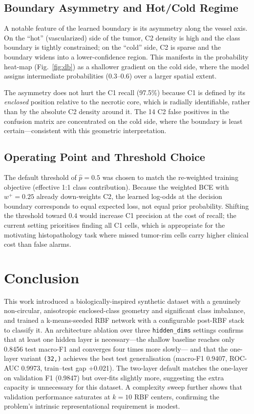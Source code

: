 \documentclass[conference]{IEEEtran}
\begin{document}
\subsection{Boundary Asymmetry and Hot/Cold Regime}
A notable feature of the learned boundary is its asymmetry along the vessel
axis.  On the ``hot'' (vascularized) side of the tumor, C2 density is high
and the class boundary is tightly constrained; on the ``cold'' side, C2 is
sparse and the boundary widens into a lower-confidence region.
This manifests in the probability heat-map (Fig.~\ref{fig:db}) as a
shallower gradient on the cold side, where the model assigns intermediate
probabilities ($0.3$--$0.6$) over a larger spatial extent.

The asymmetry does not hurt the C1 recall (97.5\%) because C1 is defined by
its \emph{enclosed} position relative to the necrotic core, which is
radially identifiable, rather than by the absolute C2 density around it.
The 14 C2 false positives in the confusion matrix are concentrated on the
cold side, where the boundary is least certain---consistent with this
geometric interpretation.

\subsection{Operating Point and Threshold Choice}
The default threshold of $\hat{p}{=}0.5$ was chosen to match the re-weighted
training objective (effective 1:1 class contribution).  Because the
weighted BCE with $w^+{=}0.25$ already down-weights C2, the learned
log-odds at the decision boundary corresponds to equal expected loss, not
equal prior probability.  Shifting the threshold toward $0.4$ would
increase C1 precision at the cost of recall; the current setting prioritises
finding all C1 cells, which is appropriate for the motivating
histopathology task where missed tumor-rim cells carry higher clinical cost
than false alarms.

\section{Conclusion}
\label{sec:conclusion}

This work introduced a biologically-inspired synthetic dataset with a genuinely
non-circular, anisotropic enclosed-class geometry and significant class
imbalance, and trained a k-means-seeded RBF network with a configurable
post-RBF stack to classify it.
An architecture ablation over three \texttt{hidden\_dims} settings
confirms that at least one hidden layer is necessary---the shallow baseline
reaches only 0.8456 test macro-F1 and converges four times more slowly---
and that the one-layer variant \texttt{(32,)} achieves the best test
generalisation (macro-F1 0.9407, ROC-AUC 0.9973, train--test gap +0.021).
The two-layer default matches the one-layer on validation F1 (0.9847) but
over-fits slightly more, suggesting the extra capacity is unnecessary for
this dataset.
A complexity sweep further shows that validation performance saturates
at $k{=}10$ RBF centers, confirming the problem's intrinsic representational
requirement is modest.
\end{document}
